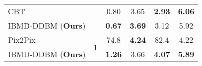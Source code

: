 \begin{table*}[t]
\begin{tabular}{lccc|cc}
CBT \cite{he2024consistency} &  & 0.80  & 3.65 &  \textbf{2.93}    &  \textbf{6.06}  \\
IBMD-DDBM (\textbf{Ours}) &   & \textbf{0.67}  & \textbf{3.69} &  3.12   &     5.92     \\ \hline
Pix2Pix \cite{isola2017image} & \multirow{2}{*}{1} & 74.8             & \textbf{4.24} & 82.4             & 4.22          \\
IBMD-DDBM (\textbf{Ours}) &  & \textbf{1.26}  & 3.66 &  \textbf{4.07}   &  \textbf{5.89}  \\ \hline
\end{tabular}
\vspace{-4.5mm}
\end{table*}


